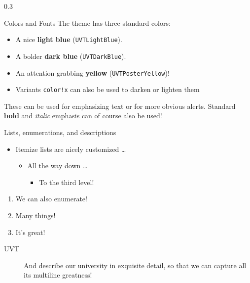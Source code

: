 \documentclass[final]{beamer}
\begin{document}
\begin{frame}[fragile]
\begin{columns}[t]
\begin{column}{0.3\paperwidth}
\begin{block}{Colors and Fonts}
    The theme has three standard colors:
    \begin{itemize}
        \item A nice \textcolor{UVTLightBlue}{\textbf{light blue}} (\texttt{UVTLightBlue}).
        \item A bolder \textcolor{UVTDarkBlue}{\textbf{dark blue}} (\texttt{UVTDarkBlue}).
        \item An attention grabbing \textcolor{UVTPosterYellow}{\textbf{yellow}}
        (\texttt{UVTPosterYellow})!
        \item Variants \texttt{color!x} can also be used to darken or lighten them
    \end{itemize}

    These can be used for emphasizing \textcolor{UVTLightBlue}{text} or for
    more obvious \alert{alerts}. Standard \textbf{bold} and \textit{italic} emphasis
    can of course also be used!
\end{block}

\begin{alertblock}{Lists, enumerations, and descriptions}

\begin{itemize}
    \item Itemize lists are nicely customized \dots
    \begin{itemize}
        \item All the way down \dots
        \begin{itemize}
            \item To the third level!
        \end{itemize}
    \end{itemize}
\end{itemize}


\begin{enumerate}
    \item We can also enumerate!
    \item Many things!
    \item It's great!
\end{enumerate}


\begin{description}
    \item[UVT] And describe our university in exquisite detail, so that we
        can capture all its multiline greatness!
\end{description}
\end{alertblock}
\end{column}


\end{columns}
\end{frame}
\end{document}
